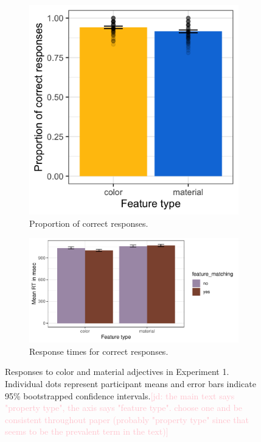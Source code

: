 \documentclass[12pt,letterpaper]{article}
\newcommand{\jd}[1]{\textcolor{Pink}{[jd: #1]}}
\begin{document}
\begin{figure}[ht]
\centering
\begin{subfigure}{.4\textwidth}
\centering
\includegraphics[width=\textwidth]{plots/exp1_proportion.png}
\caption{Proportion of correct responses.}
\label{fig:exp1_a}
\end{subfigure} \hspace{9mm}
\begin{subfigure}{.4 \textwidth}
\centering
\includegraphics[width=\textwidth]{plots/exp1_rt.png}
\caption{Response times for correct responses.}
\label{fig:exp1_b}
\end{subfigure}
\caption{Responses to color and material adjectives in Experiment 1. Individual dots represent participant means and error bars indicate 95\% bootstrapped confidence intervals.\jd{the main text says "property type", the axis says "feature type". choose one and be consistent throughout paper (probably "property type" since that seems to be the prevalent term in the text)}}
\label{fig:exp1}
\end{figure}  
\end{document}
